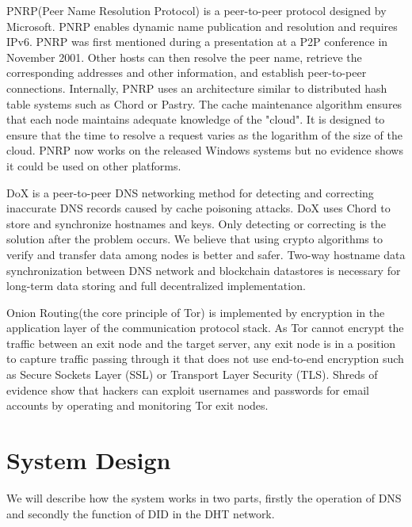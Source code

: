 \documentclass[twocolumn]{article}
\begin{document}
PNRP(Peer Name Resolution Protocol) is a peer-to-peer protocol designed by Microsoft. PNRP enables dynamic name publication and resolution and requires IPv6. PNRP was first mentioned during a presentation at a P2P conference in November 2001. Other hosts can then resolve the peer name, retrieve the corresponding addresses and other information, and establish peer-to-peer connections. Internally, PNRP uses an architecture similar to distributed hash table systems such as Chord or Pastry. The cache maintenance algorithm ensures that each node maintains adequate knowledge of the "cloud". It is designed to ensure that the time to resolve a request varies as the logarithm of the size of the cloud. PNRP now works on the released Windows systems but no evidence shows it could be used on other platforms.

DoX is a peer-to-peer DNS networking method for detecting and correcting inaccurate DNS records caused by cache poisoning attacks. DoX uses Chord to store and synchronize hostnames and keys. Only detecting or correcting is the solution after the problem occurs. We believe that using crypto algorithms to verify and transfer data among nodes is better and safer. Two-way hostname data synchronization between DNS network and blockchain datastores is necessary for long-term data storing and full decentralized implementation.

Onion Routing(the core principle of Tor\cite{TorNetwork}) is implemented by encryption in the application layer of the communication protocol stack. As Tor cannot encrypt the traffic between an exit node and the target server, any exit node is in a position to capture traffic passing through it that does not use end-to-end encryption such as Secure Sockets Layer (SSL) or Transport Layer Security (TLS). Shreds of evidence show that hackers can exploit usernames and passwords for email accounts by operating and monitoring Tor exit nodes.
\section{System Design}

We will describe how the system works in two parts, firstly the operation of DNS and secondly the function of DID in the DHT network.
\end{document}
